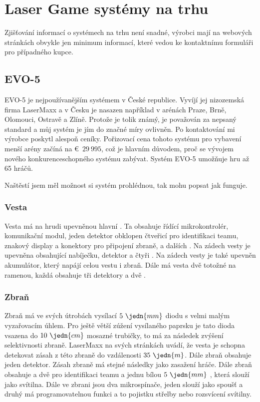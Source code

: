 \section{Laser Game systémy na trhu}
Zjišťování informací o systémech na trhu není snadné, výrobci mají na webových stránkách obvykle jen minimum informací, které vedou ke kontaktnímu formuláři pro případného kupce.

\subsection{EVO-5}

EVO-5 je nejpoužívanějším  systémem v České republice. Vyvíjí jej nizozemská firma LaserMaxx a v Česku je nasazen například v arénách Praze, Brně, Olomouci, Ostravě a Zlíně. Protože je tolik známý, je považován za nepsaný standard a můj systém je jím do značné míry ovlivněn. Po kontaktování mi výrobce poskytl alespoň ceníky. Pořizovací cena tohoto systému pro vybavení menší arény začíná na €~$29~995$, což je hlavním důvodem, proč se vývojem nového konkurenceschopného systému zabývat. Systém EVO-5 umožňuje hru až 65 hráčů.

Naštěstí jsem měl možnost si systém prohlédnou, tak mohu popsat jak funguje.

\subsubsection{Vesta}
Vesta má na hrudi upevněnou hlavní . Ta obsahuje řídící mikrokontrolér, komunikační  modul, jeden  detektor obklopen čtveřicí   pro identifikaci teamu, znakový display a konektory pro připojení zbraně, a dalších . Na zádech vesty je upevněna  obsahující nabíječku,  detektor a čtyři  . Na zádech vesty je také upevněn akumulátor, který napájí celou vestu i zbraň. Dále má vesta dvě totožné  na ramenou, každá obsahuje tři  detektory a dvě  .

\subsubsection{Zbraň}
Zbraň má ve svých útrobách vysílací $5~\jedn{mm}$   diodu s velmi malým vyzařovacím úhlem. Pro ještě větší zúžení vysílaného paprsku je tato dioda vsazena do $10~\jedn{cm}$ mosazné trubičky, to má za následek zvýšení selektivnosti zbraně. LaserMaxx na svých stránkách uvádí, že vesta je schopna detekovat zásah z této zbraně do vzdálenosti $35~\jedn{m}$. Dále zbraň obsahuje jeden  detektor. Zásah zbraně má stejné následky jako zasažení hráče. Dále zbraň obsahuje a dvě   pro identifikaci teamu a jednu bílou $5~\jedn{mm}$ , která slouží jako svítilna. Dále ve zbrani jsou dva mikrospínače, jeden slouží jako spoušť a druhý má programovatelnou funkci a to pojistku střelby nebo rozsvícení svítilny.

